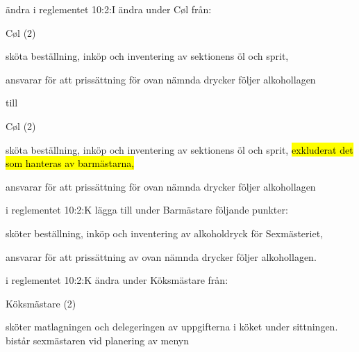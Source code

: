 \documentclass[../_main/handlingar.tex]{subfiles}
\begin{document}
\begin{attsatser}
  \att ändra i reglementet 10:2:I ändra under Cøl från:\par
  \begin{emptylist}
    \item Cøl (2)
      \begin{dashlist}
        \item sköta beställning, inköp och inventering av sektionens öl och sprit, 
        \item ansvarar för att prissättning för ovan nämnda drycker följer alkohollagen
      \end{dashlist}
    \end{emptylist}
    
    till 
    
    \begin{emptylist}
    \item Cøl (2)
      \begin{dashlist}
        \item sköta beställning, inköp och inventering av sektionens öl och sprit, \hl{exkluderat det som hanteras av barmästarna,} 
        \item ansvarar för att prissättning för ovan nämnda drycker följer alkohollagen
      \end{dashlist}
    \end{emptylist}
  \changenote


\att i reglementet 10:2:K lägga till under Barmästare följande punkter:
   
   
    

\begin{dashlist}
        \item sköter beställning, inköp och inventering av alkoholdryck för Sexmästeriet,
        \item ansvarar för att prissättning av ovan nämnda drycker följer alkohollagen.
      \end{dashlist}


\att i reglementet 10:2:K ändra under Köksmästare från:\par
  \begin{emptylist}
    \item Köksmästare (2) 
      \begin{dashlist}
        \item sköter matlagningen och delegeringen av uppgifterna i köket under sittningen. bistår sexmästaren vid planering av menyn 
      \end{dashlist}
    \end{emptylist}
    

\end{attsatser}
\end{document}
